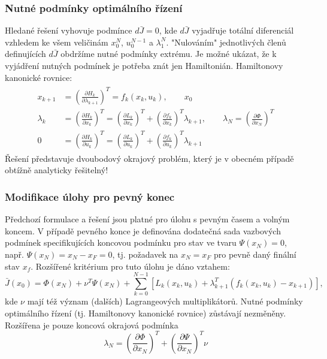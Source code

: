 \subsubsection*{Nutné podmínky optimálního řízení}
Hledané řešení vyhovuje podmínce $ d\bar{J} = 0 $, kde $ d\bar{J} $ vyjadřuje totální diferenciál vzhledem ke všem veličinám $ x_0^N $, $ u_0^{N-1} $ a $ \lambda_1^N $. "Nulováním" jednotlivých členů definujících $ d\bar{J} $ obdržíme nutné podmínky extrému. Je možné ukázat, že k vyjádření nutných podmínek je potřeba znát jen Hamiltonián. Hamiltonovy kanonické rovnice:
\begin{align*}
\begin{split}
x_{k+1} &= \left(\frac{\partial H_k}{\partial \lambda_{k+1}} \right)^T = f_k(x_k,u_k), \qquad x_0 \\
\lambda_k &= \left(\frac{\partial H_k}{\partial x_k} \right)^T = \left(\frac{\partial L_k}{\partial x_k} \right)^T + \left(\frac{\partial f_k}{\partial x_k} \right)^T \lambda_{k+1}, \qquad \lambda_N = \left(\frac{\partial \Phi}{\partial x_N} \right)^T \\
0 &= \left(\frac{\partial H_k}{\partial u_k} \right)^T = \left(\frac{\partial L_k}{\partial u_k} \right)^T + \left(\frac{\partial f_k}{\partial u_k} \right)^T \lambda_{k+1}
\end{split}
\end{align*}
Řešení představuje dvoubodový okrajový problém, který je v obecném případě obtížně analyticky řešitelný!

\subsubsection*{Modifikace úlohy pro pevný konec}
Předchozí formulace a řešení jsou platné pro úlohu s pevným časem a volným koncem. V případě pevného konce je definována dodatečná sada vazbových podmínek specifikujících koncovou podmínku pro stav ve tvaru $ \Psi(x_N) = 0 $, např. $ \Psi(x_N) = x_N - x_F = 0 $, tj. požadavek na $ x_N = x_F $ pro pevně daný finální stav $ x_f $. Rozšířené kritérium pro tuto úlohu je dáno vztahem:
\begin{equation}
\bar{J}(x_0) = \Phi(x_N) + \nu^T \Psi(x_N) + \displaystyle{\sum_{k=0}^{N-1}}\left[ L_k(x_k,u_k) + \lambda_{k+1}^T(f_k(x_k,u_k)-x_{k+1}) \right],
\end{equation}
kde $ \nu $ mají též význam (dalších) Lagrangeových multiplikátorů. Nutné podmínky optimálního řízení (tj. Hamiltonovy kanonické rovnice) zůstávají nezměněny. Rozšířena
je pouze koncová okrajová podmínka
\begin{equation}
\lambda_N = \left(\frac{\partial \Phi}{\partial x_N} \right)^T + \left(\frac{\partial \Psi}{\partial x_N} \right)^T \nu
\end{equation}

